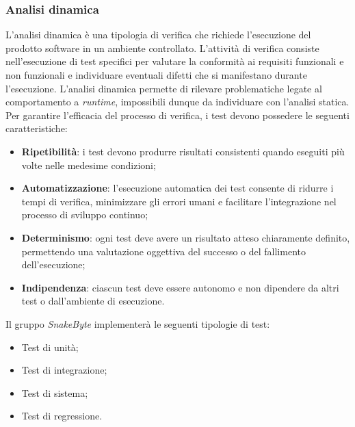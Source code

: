 \documentclass[10pt, letterpaper]{article}
\begin{document}
\subsubsection{Analisi dinamica}
L'analisi dinamica è una tipologia di verifica che richiede l'esecuzione del
prodotto software in un ambiente controllato. L'attività di verifica consiste
nell'esecuzione di test specifici per valutare la conformità ai requisiti funzionali
e non funzionali e individuare eventuali difetti che si manifestano durante l'esecuzione.
L'analisi dinamica permette di rilevare problematiche legate al comportamento
a \textit{runtime}, impossibili dunque da individuare con l'analisi statica.
\\Per garantire l'efficacia del processo di verifica, i test devono
possedere le seguenti caratteristiche:
\begin{itemize}
    \item \textbf{Ripetibilità}: i test devono produrre risultati consistenti
          quando eseguiti più volte nelle medesime condizioni;

    \item \textbf{Automatizzazione}: l'esecuzione automatica dei test consente di ridurre
          i tempi di verifica, minimizzare gli errori umani e facilitare l'integrazione
          nel processo di sviluppo continuo;

    \item \textbf{Determinismo}: ogni test deve avere un risultato atteso
          chiaramente definito, permettendo una valutazione oggettiva del successo
          o del fallimento dell'esecuzione;

    \item \textbf{Indipendenza}: ciascun test deve essere autonomo e non
          dipendere da altri test o dall'ambiente di esecuzione.
\end{itemize}
Il gruppo \textit{SnakeByte} implementerà le seguenti tipologie di test:
\begin{itemize}
    \item Test di unità;
    \item Test di integrazione;
    \item Test di sistema;
    \item Test di regressione.
\end{itemize}
\end{document}
